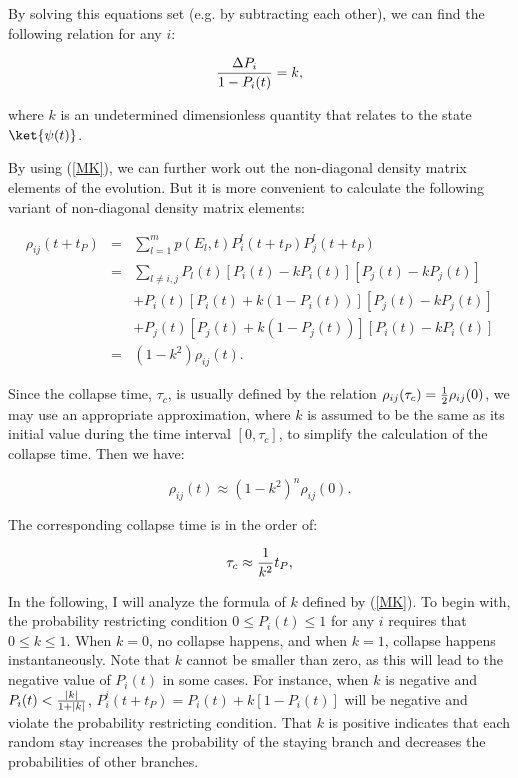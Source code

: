 \noindent By solving this equations set (e.g. by subtracting each other), we can find the following relation for any $i$:

\begin{equation}
{{\Delta P_{i}} \over {1-P_{i}(t)}}=k,
\label{MK}
\end{equation}

\noindent where $k$ is an undetermined dimensionless quantity that relates to the state $\ket{\psi(t)}$.

By using (\ref{MK}), we can further work out the non-diagonal density matrix elements of the evolution. But it is more convenient to calculate the following variant of non-diagonal density matrix elements:

\begin{eqnarray}
  \rho_{ij}(t+t_P)&=&\sum_{l=1}^m p(E_l,t) P_{i}^l (t+t_P)P_{j}^l (t+t_P)\nonumber
\\&=& \sum_{l \neq i,j} P_{l}(t)[P_{i}(t)-kP_{i}(t)][P_{j}(t)-kP_{j}(t)]\nonumber
\\ 
& & + P_{i}(t)[P_{i}(t)+k(1-P_{i}(t))][P_{j}(t)-kP_{j}(t)]\nonumber
\\ 
& & + P_{j}(t)[P_{j}(t)+k(1-P_{j}(t))][P_{i}(t)-kP_{i}(t)]\nonumber
\\ 
&=& (1-k^2)\rho_{ij}(t).
\end{eqnarray}

\noindent  Since the collapse time, $\tau_c$, is usually defined by the relation $\rho_{ij}(\tau_c)={1 \over 2}\rho_{ij}(0)$, we may use an appropriate approximation, where $k$ is assumed to be the same as its initial value during the time interval $[0, \tau_c]$, to simplify the calculation of the collapse time. Then we have:

\begin{equation}
\rho_{ij}(t)\approx (1-k^2)^{n}\rho_{ij}(0).
\label{}
\end{equation}

\noindent The corresponding collapse time is in the order of:

\begin{equation}
\tau_c \approx {1 \over {k^2}}t_P,
\label{TC}
\end{equation}

In the following, I will analyze the formula of $k$ defined by (\ref{MK}). To begin with, the probability restricting condition $0\leqslant P_{i}(t)\leqslant 1$ for any $i$ requires that $0\leqslant k \leqslant 1$. When $k=0$, no collapse happens, and when $k=1$, collapse happens instantaneously. Note that $k$ cannot be smaller than zero, as this will lead to the negative value of $P_{i}(t)$ in some cases. For instance, when $k$ is negative and $P_{i}(t)< {{|k|}\over{1+|k|}}$, $P_{i}^i(t+t_P)=P_{i}(t)+k[1-P_{i}(t)]$ will be negative and violate the probability restricting condition. That $k$ is positive indicates that each random stay increases the probability of the staying branch and decreases the probabilities of other branches.

